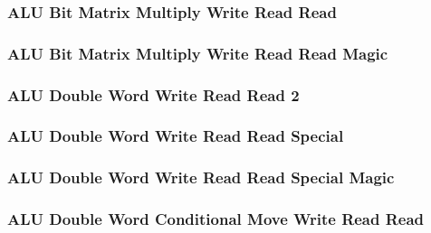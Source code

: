 \subsubsection[{\small ALU Bit Matrix Multiply Write Read Read}]{ALU Bit Matrix Multiply Write Read Read} \label{sec:format-ALU-DBMWRR}



\subsubsection[{\small ALU Bit Matrix Multiply Write Read Read Magic}]{ALU Bit Matrix Multiply Write Read Read Magic} \label{sec:format-ALU-DBMWRR.M}



\subsubsection[{\small ALU Double Word Write Read Read 2}]{ALU Double Word Write Read Read 2} \label{sec:format-ALU-DWRR2}



\subsubsection[{\small ALU Double Word Write Read Read Special}]{ALU Double Word Write Read Read Special} \label{sec:format-ALU-DWRRS}



\subsubsection[{\small ALU Double Word Write Read Read Special Magic}]{ALU Double Word Write Read Read Special Magic} \label{sec:format-ALU-DWRRS.M}



\subsubsection[{\small ALU Double Word Conditional Move Write Read Read}]{ALU Double Word Conditional Move Write Read Read} \label{sec:format-ALU-DCMWRR}

